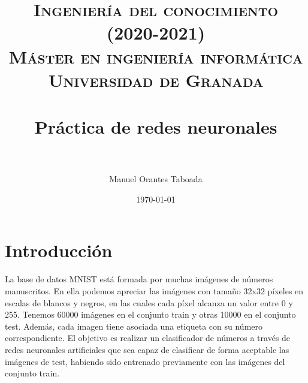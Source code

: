 
\usepackage{booktabs}
\usepackage{tabularx}
\usepackage{multicol} 


\title{
\normalfont \normalsize 
\textsc{\textbf{Ingeniería del conocimiento (2020-2021)} \\ Máster en ingeniería informática \\ Universidad de Granada} \\ [25pt] %
\horrule{0.5pt} \\[0.4cm] %
\huge Práctica de redes neuronales \\ %
\horrule{2pt} \\[0.5cm] %
}
\author{Manuel Orantes Taboada} %

\date{\normalsize\today} %




\maketitle %

\newpage %

\tableofcontents %

\newpage

\section{Introducción}

La base de datos MNIST está formada por muchas imágenes de números manuscritos. En ella podemos apreciar las imágenes con tamaño 32x32 píxeles en escalas de blancos y negros, en las cuales cada píxel alcanza un valor entre 0 y 255. Tenemos 60000 imágenes en el conjunto train y otras 10000 en el conjunto test. Además, cada imagen tiene asociada una etiqueta con su número correspondiente. El objetivo es realizar un clasificador de números a través de redes neuronales artificiales que sea capaz de clasificar de forma aceptable las imágenes de test, habiendo sido entrenado previamente con las imágenes del conjunto train. 

